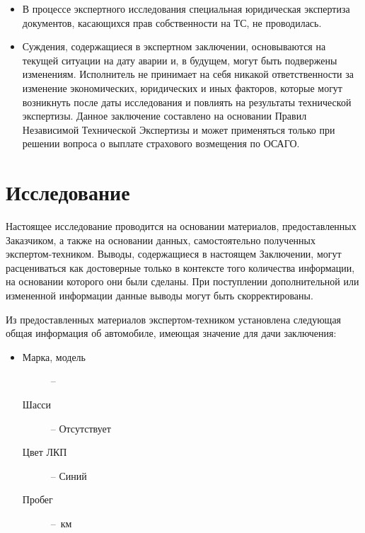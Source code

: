 \begin{itemize}
\item  {В процессе экспертного исследования специальная юридическая экспертиза документов, касающихся прав собственности на ТС, не проводилась.}
\item  {Суждения, содержащиеся в экспертном заключении, основываются на текущей ситуации на дату аварии и, в будущем, могут быть подвержены изменениям.
Исполнитель не принимает на себя никакой ответственности за изменение экономических, юридических и иных факторов, которые могут возникнуть после даты исследования и повлиять на результаты технической экспертизы.
Данное заключение составлено на основании Правил Независимой Технической Экспертизы и может применяться только при решении вопроса о выплате страхового возмещения по ОСАГО.
}\end{itemize}
% 
\section{Исследование}
%
%
Настоящее исследование проводится на основании материалов, предоставленных Заказчиком, а также на основании данных, самостоятельно полученных экспертом-техником. Выводы, содержащиеся в настоящем Заключении, могут расцениваться как достоверные только в контексте того количества информации, на основании которого они были сделаны. При поступлении дополнительной или измененной информации данные выводы могут быть
скорректированы. %
 \par Из предоставленных материалов   экспертом-техником установлена следующая общая информация об автомобиле, имеющая значение для дачи заключения:\\
 \parbox[]{10cm}{}
	\begin{itemize}
		\item[ ] 
			\begin{description}
			\item[Марка, модель] -- 
			\item[Шасси] -- Отсутствует
			\item[Цвет ЛКП] -- Синий
			\item[Пробег] --  \,км%
		\end{description}
		\end{itemize}
